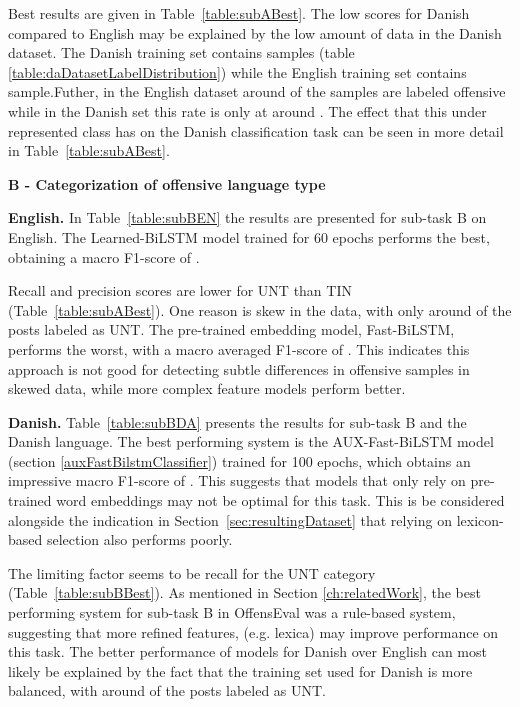 \documentclass{article}
\begin{document}
Best results are given in Table~\ref{table:subABest}. 
The low scores for Danish compared to English may be explained by the low amount of data in the Danish dataset. The Danish training set contains  samples (table \ref{table:daDatasetLabelDistribution}) while the English training set contains  sample.Futher, in the English dataset around  of the samples are labeled offensive while in the Danish set this rate is only at around . The effect that this under represented class has on the Danish classification task can be seen in more detail in Table~\ref{table:subABest}. 



\textbf{B - Categorization of offensive language type}\label{sec:resultsSubB}

\textbf{English.} In Table~\ref{table:subBEN} the results are presented for sub-task B on English. The Learned-BiLSTM model  trained for 60 epochs performs the best, obtaining a macro F1-score of . 

Recall and precision scores are lower for UNT than TIN  (Table~\ref{table:subABest}). One reason is skew in the data, with only around  of the posts labeled as UNT. The pre-trained embedding model, Fast-BiLSTM, performs the worst, with a macro averaged F1-score of . This indicates this approach is not  good for detecting subtle differences in offensive samples in skewed data, while more complex feature models perform better.

\textbf{Danish.} Table~\ref{table:subBDA} presents the results for sub-task B and the Danish language. The best performing system is the AUX-Fast-BiLSTM model (section \ref{auxFastBilstmClassifier}) trained for 100 epochs, which obtains an impressive macro F1-score of . This suggests that models that only rely on pre-trained word embeddings may not be optimal for this task. This is be considered alongside the indication in Section~\ref{sec:resultingDataset} that relying on lexicon-based selection also performs poorly.

The limiting factor seems to be  recall for the UNT category (Table~\ref{table:subBBest}). As mentioned in Section \ref{ch:relatedWork}, the best performing system for sub-task B in OffensEval was a rule-based system, suggesting that more refined features, (e.g. lexica) may improve  performance on this task. The better performance of models for Danish over English can most likely be explained by the fact that the training set used for Danish is more balanced, with around  of the posts labeled as UNT. \\
\end{document}
